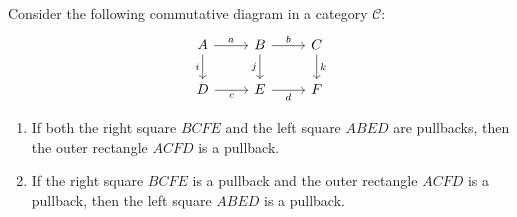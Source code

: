 \begin{theorem}
\label{thm:pasting_lemma}
Consider the following commutative diagram in a category $\mathcal{C}$:
\begin{equation}
\label{eq:pasting_diagram}
\begin{tikzcd}
A \arrow[r, "a"] \arrow[d, "i"'] & B \arrow[r, "b"] \arrow[d, "j"'] & C \arrow[d, "k"] \\
D \arrow[r, "c"'] & E \arrow[r, "d"'] & F
\end{tikzcd}
\end{equation}
\begin{enumerate}
    \item If both the right square $BCFE$ and the left square $ABED$ are pullbacks, then the outer rectangle $ACFD$ is a pullback.
    \item If the right square $BCFE$ is a pullback and the outer rectangle $ACFD$ is a pullback, then the left square $ABED$ is a pullback.
\end{enumerate}
\end{theorem}

